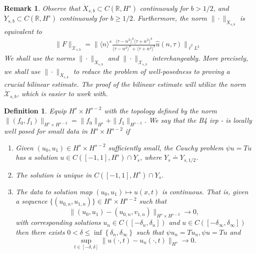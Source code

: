 \documentclass[12pt,reqno]{amsart}
\numberwithin{equation}{section}  %
\renewcommand{\cref}{\Cref}
\newcommand{\rr}{\mathbb{R}}
\newcommand{\wh}{\widehat}
\newtheorem{definition}[theorem]{Definition}
\newtheorem{remark}[theorem]{Remark}
\begin{document}
\begin{remark}
Observe that $\dot{X}_{s,b} \subset C(\rr, H^{s})$ continuously for $b>1/2$, and $\dot{Y}_{s,b} \subset C(\rr, H^{s})$ continuously for $b\ge1/2$. Furthermore, the norm $\| \cdot \|_{\dot{X}_{s,b}}$ is equivalent to
\begin{equation*}
\begin{split}
\| F \|_{\mathcal{\dot{X}}_{s,b}}
= \| \langle n \rangle ^{s} \frac{\langle \tau - n^{2} \rangle ^{b} \langle \tau + n^{2} \rangle ^{b}}{\langle \tau - n^{2} \rangle ^{b} + \langle \tau + n^{2} \rangle ^{b}} \wh{u}(n, \tau) \|_{\dot{\ell}^{2}L^{2}}
\end{split}
\end{equation*}
We shall use the norms $\| \cdot \|_{X_{s,b}}$ and $\| \cdot \|_{\mathcal{X}_{s,b}}$ interchangeably. More precisely, we shall use $\| \cdot \|_{X_{s,b}}$ to reduce the problem of well-posedness to proving a crucial bilinear estimate. The proof of the bilinear estimate will utilize the norm $\mathcal{\dot{X}}_{s,b}$, which is easier to work with.
\end{remark}


\begin{definition}
Equip $H^{s} \times H^{s-2}$ with the 
topology defined by the norm $\|(f_0, f_1)\|_{H^{s} \times H^{s-2}}
= \|f_0\|_{H^{s}} + \|f_1\|_{H^{s-2}}$.
We say that the B4 ivp
\cref{eqn:mb-2}-\cref{eqn:mb-init-data-2} is
\emph{locally well posed} for small data in
$H^s \times H^{s-2}$ if 
\begin{enumerate}
\item Given $(u_{0}, u_{1}) \in H^{s} \times H^{s-2}$
sufficiently small, the Cauchy problem
$\psi u = Tu$ has a solution $u \in C([-1,
1], H^s) \cap Y_{s}$, where $Y_{s} \doteq Y_{s,1/2}$. 
\item The solution is unique in $C([-1, 1], H^{s}) \cap
Y_{s}$.
\item
The data to solution map $(u_0, u_{1}) \mapsto u(x,t)$ is continuous. That
is, given a sequence $\{(u_{0,n}, u_{1,n} ) \} \in H^{s} \times H^{s-2}$
such that $$\|(u_{0}, u_{1})
- (u_{0,n}, v_{1,n}) \|_{H^{s} \times
H^{s-2}} \to 0,$$ with corresponding solutions $u_{n} \in
C([-\delta_{n},
\delta_{n}])$ and $u \in C([-\delta_{\infty}, \delta_{\infty}])$
then there exists $0 < \delta \le \inf\left\{
\delta_{n}, \delta_{\infty} \right\}$ such that $\psi u_{n} =
Tu_{n}, \psi u = Tu$ and 
$$\sup_{t \in [-\delta, \delta]}
\|u(\cdot, t) - u_{n}(\cdot, t) \|_{H^s} \to 0.$$
\end{enumerate}
\end{definition}
\end{document}
